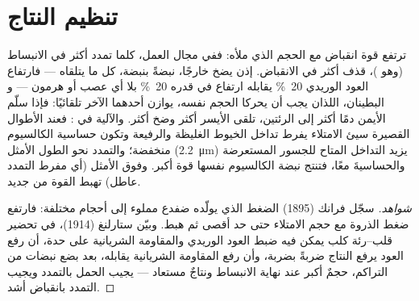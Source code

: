 \section{تنظيم النتاج}

\begin{theorem}\label{thm:b2:heart:starling}
ترتفع قوة انقباض  مع الحجم الذي
ملأه: ففي مجال العمل، كلما تمدد  أكثر
في الانبساط (وهو \emph{})، قذف أكثر في
الانقباض.  إذن يضخ خارجًا، نبضةً بنبضة، كل ما
يتلقاه --- فارتفاع العود الوريدي \qty{20}{\%} يقابله ارتفاع
في  قدره \qty{20}{\%} بلا أي عصب أو هرمون --- و
البطينان، اللذان يجب أن يحركا الحجم نفسه، يوازن أحدهما
الآخر تلقائيًا: فإذا سلّم  الأيمن دمًا أكثر إلى
الرئتين، تلقى  الأيسر أكثر وضخ أكثر. والآلية
في : فعند الأطوال القصيرة  سيئ
الامتلاء يفرط تداخل الخيوط الغليظة والرفيعة وتكون
حساسية الكالسيوم منخفضة؛ والتمدد نحو الطول الأمثل
(\qty{2.2}{\micro m}) يزيد التداخل المتاح
للجسور المستعرضة والحساسيةَ معًا، فتنتج نبضة الكالسيوم نفسها
قوة أكبر. وفوق الأمثل (أي  مفرط التمدد
عاطل) تهبط القوة من جديد.
\end{theorem}
\begin{proof}[شواهد]
سجّل فرانك (1895) الضغط الذي يولّده  ضفدع
مملوء إلى أحجام مختلفة: فارتفع ضغط الذروة مع حجم
الامتلاء حتى حد أقصى ثم هبط. وبيّن ستارلنغ (1914)، في
تحضير قلب--رئة كلب يمكن فيه ضبط العود الوريدي والمقاومة
الشريانية على حدة، أن رفع العود يرفع النتاج ضربةً
بضربة، وأن رفع المقاومة الشريانية يقابله، بعد بضع نبضات من التراكم،
حجمٌ أكبر عند نهاية الانبساط ونتاجٌ مستعاد --- 
يجيب الحمل بالتمدد ويجيب التمدد بانقباض أشد.
\end{proof}

